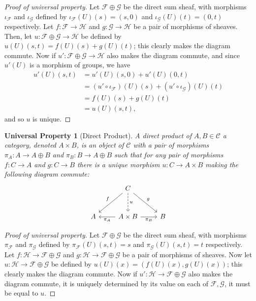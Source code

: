 \documentclass[10pt]{article}
\newtheorem*{universalproperty}{Universal Property}
\theoremstyle{definition}
\theoremstyle{remark}
\numberwithin{equation}{section}
\numberwithin{figure}{subsubsection}
\begin{document}
\begin{proof}[Proof of universal property]
  Let $\mathscr{F} \oplus \mathscr{G}$ be the direct sum sheaf, with morphisms
  $\iota_\mathscr{F}$ and $\iota_\mathscr{G}$ defined by $\iota_{\mathscr{F}}(U)(s) = (s,0)$ and $\iota_{\mathscr{G}}(U)(t) = (0,t)$ respectively. Let $f\colon \mathscr{F} \to \mathscr{H}$ and $g\colon \mathscr{G} \to \mathscr{H}$ be a pair of morphisms of sheaves. Then, let $u\colon\mathscr{F}\oplus\mathscr{G} \to \mathscr{H}$ be defined by $u(U)(s,t) = f(U)(s) + g(U)(t)$; this clearly makes the diagram commute. Now if $u'\colon\mathscr{F}\oplus\mathscr{G} \to \mathscr{H}$ also makes the diagram commute, and since $u'(U)$ is a morphism of groups, we have
  \begin{align*}
    u'(U)(s,t) &= u'(U)(s,0) + u'(U)(0,t)\\
    &= (u' \circ \iota_\mathscr{F})(U)(s) + (u' \circ \iota_\mathscr{G})(U)(t)\\
    &= f(U)(s) + g(U)(t)\\
    &= u(U)(s,t),
  \end{align*}
  and so $u$ is unique.
\end{proof}
\begin{universalproperty}[Direct Product]
  A \emph{direct product} of $A,B \in \mathscr{C}$ a category, denoted $A \times B$, is an object of $\mathscr{C}$ with a pair of morphisms $\pi_A\colon A \to A \oplus B$ and $\pi_B\colon B \to A \oplus B$ such that for any pair of morphisms $f\colon C \to A$ and $g\colon C \to B$ there is a unique morphism $u \colon C \to A \times B$ making the following diagram commute:
  \begin{equation*}
    \begin{tikzcd}[row sep=large]
      & C\arrow{dl}[swap]{f}\arrow{dr}{g}\dar[dashed]{u}\\
      A & A \times B \lar{\pi_A} \rar[swap]{\pi_B} & B
    \end{tikzcd}
  \end{equation*}
\end{universalproperty}
\begin{proof}[Proof of universal property]
  Let $\mathscr{F} \oplus \mathscr{G}$ be the direct sum sheaf, with morphisms
  $\pi_\mathscr{F}$ and $\pi_\mathscr{G}$ defined by $\pi_{\mathscr{F}}(U)(s,t) = s$ and $\pi_{\mathscr{G}}(U)(s,t) = t$ respectively. Let $f\colon \mathscr{H} \to \mathscr{F} \oplus \mathscr{G}$ and $g\colon \mathscr{H} \to \mathscr{F} \oplus \mathscr{G}$ be a pair of morphisms of sheaves. Now let $u\colon\mathscr{H} \to \mathscr{F} \oplus \mathscr{G}$ be defined by $u(U)(x) = (f(U)(x),g(U)(x))$; this clearly makes the diagram commute. Now if $u'\colon \mathscr{H} \to \mathscr{F} \oplus \mathscr{G}$ also makes the diagram commute, it is uniquely determined by its value on each of $\mathscr{F},\mathscr{G}$, it must be equal to $u$.
\end{proof}
\end{document}
